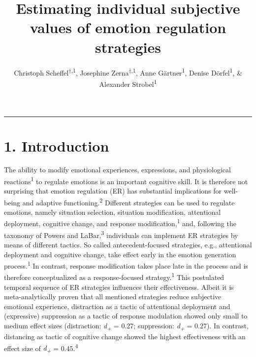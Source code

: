 \documentclass[
  english,
  man,floatsintext]{apa6}
\title{Estimating individual subjective values of emotion regulation strategies}
\author{Christoph Scheffel\textsuperscript{$\dagger{}$,1}, Josephine Zerna\textsuperscript{$\dagger{}$,1}, Anne Gärtner\textsuperscript{1}, Denise Dörfel\textsuperscript{1}, \& Alexander Strobel\textsuperscript{1}}
\date{}
\affiliation{\vspace{0.5cm}\textsuperscript{1} Faculty of Psychology, Technische Universität Dresden, 01069 Dresden, Germany}
\begin{document}
\maketitle

\renewcommand\thesection{\Alph{section}}
\setcounter{figure}{0}

\begin{center}\rule{0.5\linewidth}{0.5pt}\end{center}

\hypertarget{introduction}{%
\section{1. Introduction}\label{introduction}}

The ability to modify emotional experiences, expressions, and physiological reactions\textsuperscript{1} to regulate emotions is an important cognitive skill.
It is therefore not surprising that emotion regulation (ER) has substantial implications for well-being and adaptive functioning.\textsuperscript{2}
Different strategies can be used to regulate emotions, namely situation selection, situation modification, attentional deployment, cognitive change, and response modification,\textsuperscript{1} and, following the taxonomy of Powers and LaBar,\textsuperscript{3} individuals can implement ER strategies by means of different tactics.
So called antecedent-focused strategies, e.g., attentional deployment and cognitive change, take effect early in the emotion generation process.\textsuperscript{1}
In contrast, response modification takes place late in the process and is therefore conceptualized as a response-focused strategy.\textsuperscript{1}
This postulated temporal sequence of ER strategies influences their effectiveness.
Albeit it is meta-analytically proven that all mentioned strategies reduce subjective emotional experience, distraction as a tactic of attentional deployment and (expressive) suppression as a tactic of response modulation showed only small to medium effect sizes (distraction: \emph{d\textsubscript{+}} = 0.27; suppression: \emph{d\textsubscript{+}} = 0.27).
In contrast, distancing as tactic of cognitive change showed the highest effectiveness with an effect size of \emph{d\textsubscript{+}} = 0.45.\textsuperscript{4}
\end{document}
